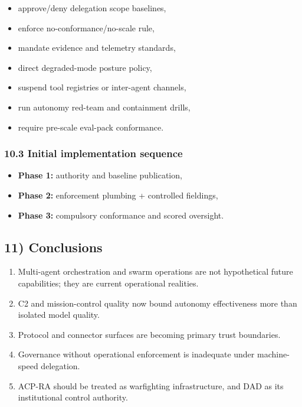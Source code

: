\documentclass[11pt]{article}
\begin{document}
\begin{itemize}
\tightlist
\item
  approve/deny delegation scope baselines,
\item
  enforce no-conformance/no-scale rule,
\item
  mandate evidence and telemetry standards,
\item
  direct degraded-mode posture policy,
\item
  suspend tool registries or inter-agent channels,
\item
  run autonomy red-team and containment drills,
\item
  require pre-scale eval-pack conformance.
\end{itemize}

\hypertarget{initial-implementation-sequence}{%
\subsubsection{10.3 Initial implementation
sequence}\label{initial-implementation-sequence}}

\begin{itemize}
\tightlist
\item
  \textbf{Phase 1:} authority and baseline publication,
\item
  \textbf{Phase 2:} enforcement plumbing + controlled fieldings,
\item
  \textbf{Phase 3:} compulsory conformance and scored oversight.
\end{itemize}

\hypertarget{conclusions}{%
\subsection{11) Conclusions}\label{conclusions}}

\begin{enumerate}
\def\labelenumi{\arabic{enumi}.}
\tightlist
\item
  Multi-agent orchestration and swarm operations are not hypothetical
  future capabilities; they are current operational realities.
\item
  C2 and mission-control quality now bound autonomy effectiveness more
  than isolated model quality.
\item
  Protocol and connector surfaces are becoming primary trust boundaries.
\item
  Governance without operational enforcement is inadequate under
  machine-speed delegation.
\item
  ACP-RA should be treated as warfighting infrastructure, and DAD as its
  institutional control authority.
\end{enumerate}
\end{document}
